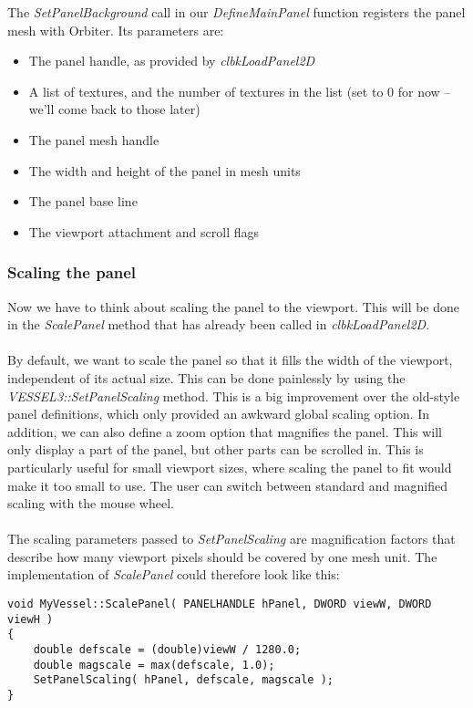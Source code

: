 \documentclass[Orbiter Developer Manual.tex]{subfiles}
\begin{document}
\noindent
The \textit{SetPanelBackground} call in our \textit{DefineMainPanel} function registers the panel mesh with Orbiter. Its parameters are:

\begin{itemize}
\item The panel handle, as provided by \textit{clbkLoadPanel2D}
\item A list of textures, and the number of textures in the list (set to 0 for now – we’ll come back to those later)
\item The panel mesh handle
\item The width and height of the panel in mesh units
\item The panel base line
\item The viewport attachment and scroll flags
\end{itemize}


\subsubsection{Scaling the panel}
Now we have to think about scaling the panel to the viewport. This will be done in the \textit{ScalePanel} method that has already been called in \textit{clbkLoadPanel2D}.\\
\\
By default, we want to scale the panel so that it fills the width of the viewport, independent of its actual size. This can be done painlessly by using the \textit{VESSEL3::SetPanelScaling} method. This is a big improvement over the old-style panel definitions, which only provided an awkward global scaling option. In addition, we can also define a zoom option that magnifies the panel. This will only display a part of the panel, but other parts can be scrolled in. This is particularly useful for small viewport sizes, where scaling the panel to fit would make it too small to use. The user can switch between standard and magnified scaling with the mouse wheel.\\
\\
The scaling parameters passed to \textit{SetPanelScaling} are magnification factors that describe how many viewport pixels should be covered by one mesh unit. The implementation of \textit{ScalePanel} could therefore look like this:

\begin{lstlisting}
void MyVessel::ScalePanel( PANELHANDLE hPanel, DWORD viewW, DWORD viewH )
{
	double defscale = (double)viewW / 1280.0;
	double magscale = max(defscale, 1.0);
	SetPanelScaling( hPanel, defscale, magscale );
}
\end{lstlisting}
\end{document}
